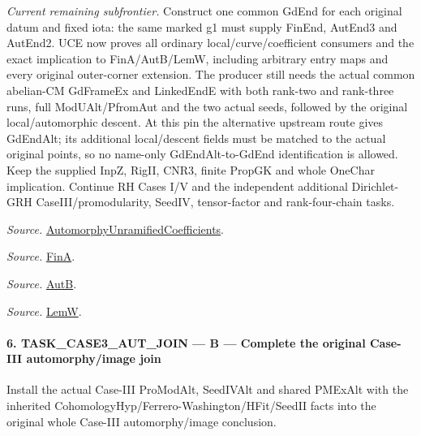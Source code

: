 \emph{Current remaining subfrontier.} Construct one common GdEnd for each original datum and fixed iota: the same marked g1 must supply FinEnd, AutEnd3 and AutEnd2. UCE now proves all ordinary local/curve/coefficient consumers and the exact implication to FinA/AutB/LemW, including arbitrary entry maps and every original outer-corner extension. The producer still needs the actual common abelian-CM GdFrameEx and LinkedEndE with both rank-two and rank-three runs, full ModUAlt/PfromAut and the two actual seeds, followed by the original local/automorphic descent. At this pin the alternative upstream route gives GdEndAlt; its additional local/descent fields must be matched to the actual original points, so no name-only GdEndAlt-to-GdEnd identification is allowed. Keep the supplied InpZ, RigII, CNR3, finite PropGK and whole OneChar implication. Continue RH Cases I/V and the independent additional Dirichlet-GRH CaseIII/promodularity, SeedIV, tensor-factor and rank-four-chain tasks.

\emph{Source.} \href{https://github.com/CocoSgt/riemann-hypothesis-lean/blob/7cbf7a0c32fca1badf05931879a37c3f8a2b03b4/src/Development/AutomorphicArithmetic/AutomorphicVarieties/AutomorphicCases/AutomorphyUnramifiedCoefficients.lean#L24-L27}{AutomorphyUnramifiedCoefficients}.

\emph{Source.} \href{https://github.com/CocoSgt/riemann-hypothesis-lean/blob/7cbf7a0c32fca1badf05931879a37c3f8a2b03b4/src/Development/AutomorphicArithmetic/AutomorphicVarieties/AutomorphicCases/AutomorphyUnramifiedCoefficients.lean#L12-L13}{FinA}.

\emph{Source.} \href{https://github.com/CocoSgt/riemann-hypothesis-lean/blob/7cbf7a0c32fca1badf05931879a37c3f8a2b03b4/src/Development/AutomorphicArithmetic/AutomorphicVarieties/AutomorphicCases/AutomorphyUnramifiedCoefficients.lean#L15-L17}{AutB}.

\emph{Source.} \href{https://github.com/CocoSgt/riemann-hypothesis-lean/blob/7cbf7a0c32fca1badf05931879a37c3f8a2b03b4/src/Development/AutomorphicArithmetic/AutomorphicVarieties/AutomorphicCases/AutomorphyUnramifiedCoefficients.lean#L19-L22}{LemW}.



\paragraph{6. TASK\_\allowbreak CASE3\_\allowbreak AUT\_\allowbreak JOIN — B — Complete the original Case-III automorphy/image join}

Install the actual Case-III ProModAlt, SeedIVAlt and shared PMExAlt with the inherited CohomologyHyp/Ferrero-Washington/HFit/SeedII facts into the original whole Case-III automorphy/image conclusion.

